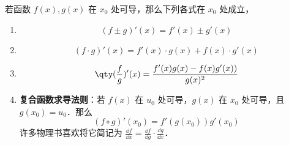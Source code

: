 

若函数 $f(x),g(x)$ 在 $x_0$ 处可导，那么下列各式在 $x_0$ 处成立，

\begin{enumerate}
\item 
\begin{equation}
(f\pm g)'(x)=f'(x)\pm g'(x)
\end{equation}
\item 
\begin{equation}
(f\cdot g)'(x)=f'(x)\cdot g(x)+f(x)\cdot g'(x)
\end{equation}
\item 
\begin{equation}
\qty(\frac{f}{g})'(x)=\frac{f'(x)g(x)-f(x)g'(x))}{g(x)^2}
\end{equation}
\item \textbf{复合函数求导法则}：若 $f(x)$ 在 $u_0$ 处可导，$g(x)$ 在 $x_0$ 处可导，且 $g(x_0)=u_0$．那么 
\begin{equation}
(f\circ g)'(x_0)=f'(g(x_0))g'(x_0)
\end{equation}
许多物理书喜欢将它简记为 $\frac{\dd f}{\dd x}=\frac{\dd f}{\dd g} \cdot \frac{\dd g}{\dd x}$．
\end{enumerate}


